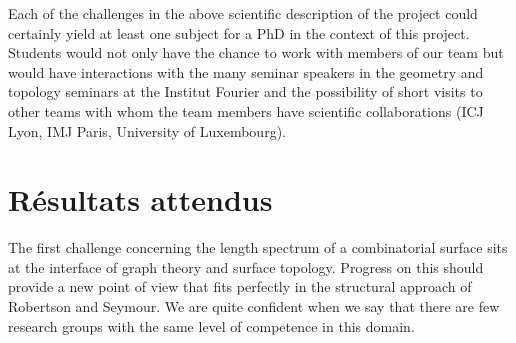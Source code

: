 \documentclass[14pt,fleqn]{article}
\begin{document}
%

\vspace{.25in}



Each of the challenges  in the above scientific description of the project
could certainly yield 
at least one subject for a PhD
in the context of this project.
Students would not only have the chance
to work with members of our team 
but would have interactions with
the  many seminar speakers 
in the geometry and topology seminars 
at the Institut Fourier
and the possibility of short visits
to other teams with whom the team members
have scientific collaborations
(ICJ Lyon, IMJ Paris, University of Luxembourg).




\section{Résultats attendus}

The first challenge concerning the length spectrum of a combinatorial surface sits at the interface of graph theory and surface topology. Progress on this should provide a new point of view that fits perfectly in the structural approach of Robertson and Seymour. We are quite confident when we say  that there are few research groups with the same level of competence  in this domain.
\end{document}

